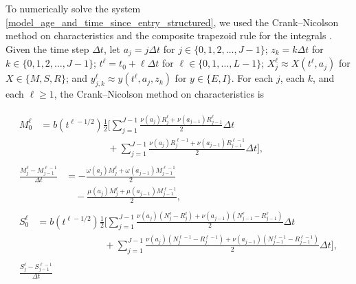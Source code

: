 \documentclass{jpmarticle}
\let\subequationsorig\subequations%
\let\endsubequationsorig\endsubequations%
\renewenvironment{subequations}{
  \subequationsorig
  \renewcommand{\theequation}{\theparentequation.\arabic{equation}}
}{
  \endsubequationsorig
}
\begin{document}
To numerically solve the system
\eqref{model_age_and_time_since_entry_structured}, we used the
Crank--Nicolson method on characteristics and the composite trapezoid
rule for the integrals \autocite{milner_1992}.  Given the time step
$\Delta t$, let $a_j = j \Delta t$ for
$j \in \{0, 1, 2, \ldots, J - 1\}$;
$z_k = k \Delta t$
for $k \in \{0, 1, 2, \ldots, J - 1\}$;
$t^{\ell} = t_0 + \ell \Delta t$ for
$\ell \in \{0, 1, \ldots, L - 1\}$;
$X_j^{\ell} \approx X(t^{\ell}, a_j)$
for $X \in \{M, S, R\}$;
and $y_{j, k}^{\ell} \approx y(t^{\ell}, a_j, z_k)$
for $y \in \{E, I\}$.
For each $j$, each $k$, and each $\ell \geq 1$, the Crank--Nicolson
method on characteristics is
\begin{subequations}
  \begin{align}
    \begin{split}
      M_0^{\ell}
      &=
      b(t^{\ell - 1 / 2})
      \frac{1}{2}
      \Bigg[
      \sum_{j = 1}^{J - 1}
      \frac{\nu(a_j) R_j^{\ell} + \nu(a_{j - 1}) R_{j - 1}^{\ell}}{2}
      \Delta t
      \\ & \quad\quad\quad\quad\quad\quad\quad {}
      + \sum_{j = 1}^{J - 1}
      \frac{\nu(a_j) R_j^{\ell - 1} + \nu(a_{j - 1}) R_{j - 1}^{\ell - 1}}{2}
      \Delta t
      \Bigg],
    \end{split}
    \\
    \begin{split}
      \frac{M_j^{\ell} - M_{j - 1}^{\ell - 1}}{\Delta t}
      &=
      - \frac{\omega(a_j) M_j^{\ell}
        + \omega(a_{j - 1}) M_{j - 1}^{\ell - 1}}
      {2}
      \\ & \quad {}
      - \frac{\mu(a_j) M_j^{\ell}
        + \mu(a_{j - 1}) M_{j - 1}^{\ell - 1}}
      {2},
    \end{split}
    \\
    \begin{split}
      S_0^{\ell}
      &=
      b(t^{\ell - 1 / 2})
      \frac{1}{2}
      \Bigg[
      \sum_{j = 1}^{J - 1}
      \frac{\nu(a_j) (N_j^{\ell} - R_j^{\ell})
        + \nu(a_{j - 1}) (N_{j - 1}^{\ell} - R_{j - 1}^{\ell})}
      {2}
      \Delta t
      \\ & \quad\quad\quad\quad\quad\quad\quad {}
      + \sum_{j = 1}^{J - 1}
      \frac{\nu(a_j) (N_j^{\ell - 1} - R_j^{\ell - 1})
        + \nu(a_{j - 1}) (N_{j - 1}^{\ell - 1} - R_{j - 1}^{\ell - 1})}
      {2}
      \Delta t
      \Bigg],
    \end{split}
    \\
    \begin{split}
      \frac{S_j^{\ell} - S_{j - 1}^{\ell - 1}}{\Delta t}

\end{split}
\end{align}
\end{subequations}
\end{document}
